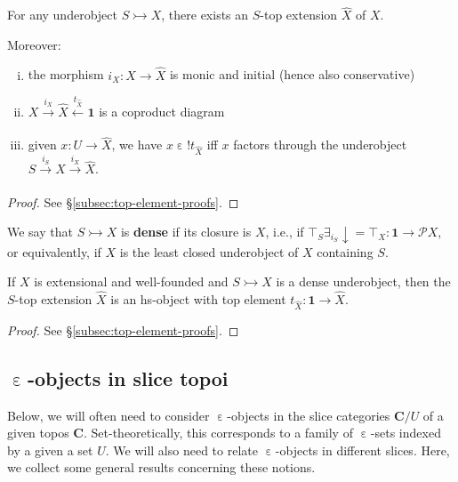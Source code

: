 \documentclass{amsart}
\newcommand\alttext{\texorpdfstring}
\newcommand\bC{\mathbf{C}}
\newcommand\defword[1]{{\boldmath \textbf{#1}}}
\newcommand\dwn{\mathpunct{\downarrow}}
\newcommand\ein{\mathrel{\varepsilon}}
\newcommand\pow{\mathcal{P}}
\newcommand\tm{\mathbf{1}}
\newcommand\tox[2][]{\xrightarrow[#1]{#2}}
\newcommand\tto{\rightarrowtail}
\newcommand\unein{{\ein}}
\newcommand\unex{{!}}
\newcommand\wh[1]{\widehat{#1}}
\newcommand\xot[2][]{\xleftarrow[#1]{#2}}
\theoremstyle{definition}
\theoremstyle{remark}
\theoremstyle{plainwithref}
\begin{document}
\begin{propn} \label{propn:top-ext-props}
  For any underobject \( S \tto X \), there exists an \( S \)-top extension \( \wh X \) of \( X \).

  Moreover:
  \begin{enumerate}[(i)]
  \item\label{item:top-ext-props-first} the morphism \( i_X \colon X \to \wh X \) is monic and initial (hence also conservative)
  \item\label{item:top-ext-props-coprod} \( X \tox{i_X} \wh X \xot{t_{\wh X}} \tm \) is a coproduct diagram
  \item\label{item:top-ext-props-el} \label{item:top-ext-props-last} given \( x \colon U \to \wh X \), we have \( x \ein \unex t_{\wh X} \) iff \( x \) factors through the underobject \( S \tox{i_S} X \tox{i_X} \wh X \).
  \end{enumerate}
\end{propn}
\begin{proof}
  See \hyperref[proof:top-ext-props]{\S\ref*{subsec:top-element-proofs}}.
\end{proof}

\begin{defn} \label{defn:dense}
  We say that \( S \tto X \) is \defword{dense} if its closure is \( X \), i.e., if \( \top_S \exists_{i_S} \dwn = \top_X \colon \tm \to \pow X \), or equivalently, if \( X \) is the least closed underobject of \( X \) containing \( S \).
\end{defn}

\begin{propn} \label{propn:top-ext-is-hs-struct}
  If \( X \) is extensional and well-founded and \( S \tto X \) is a dense underobject, then the \( S \)-top extension \( \wh X \) is an hs-object with top element \( t_{\wh X} \colon \tm \to \wh X \).
\end{propn}
\begin{proof}
  See \hyperref[proof:top-ext-is-hs-struct]{\S\ref*{subsec:top-element-proofs}}.
\end{proof}

\subsection{\alttext{\( \unein \)}{ε}-objects in slice topoi} \label{subsec:ein-in-slice}
Below, we will often need to consider \( \unein \)-objects in the slice categories \( \bC / U \) of a given topos \( \bC \).
Set-theoretically, this corresponds to a family of \( \unein \)-sets indexed by a given a set \( U \).
We will also need to relate \( \unein \)-objects in different slices.
Here, we collect some general results concerning these notions.
\end{document}
